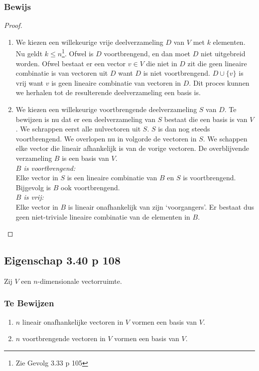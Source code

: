 \documentclass[lineaire_algebra_oplossingen.tex]{subfiles}
\begin{document}
\subsubsection*{Bewijs}
\begin{proof}
\begin{enumerate}
\item
We kiezen een willekeurige vrije deelverzameling $D$ van $V$ met $k$ elementen. Nu geldt $k\le n$\footnote{Zie Gevolg 3.33 p 105}. Ofwel is $D$ voortbrengend, en dan moet $D$ niet uitgebreid worden. Ofwel bestaat er een vector $v\in V$ die niet in $D$ zit die geen lineaire combinatie is van vectoren uit $D$ want $D$ is niet voortbrengend. $D \cup \{v\}$ is vrij want $v$ is geen lineaire combinatie van vectoren in $D$. Dit proces kunnen we herhalen tot de resulterende deelverzameling een basis is.
\item
We kiezen een willekeurige voortbrengende deelverzameling $S$ van $D$. Te bewijzen is nu dat er een deelverzameling van $S$ bestaat die een basis is van $V$. We schrappen eerst alle nulvectoren uit $S$. $S$ is dan nog steeds voortbrengend. We overlopen nu in volgorde de vectoren in $S$. We schappen elke vector die lineair afhankelijk is van de vorige vectoren. De overblijvende verzameling $B$ is een basis van $V$.\\
\emph{$B$ is voortbrengend:}\\
Elke vector in $S$ is een lineaire combinatie van $B$ en $S$ is voortbrengend. Bijgevolg is $B$ ook voortbrengend.\\
\emph{$B$ is vrij:}\\
Elke vector in $B$ is lineair onafhankelijk van zijn `voorgangers'. Er bestaat dus geen niet-triviale lineaire combinatie van de elementen in $B$.
\end{enumerate}
\end{proof}


\subsection{Eigenschap 3.40 p 108}
\label{3.40}
Zij $V$ een $n$-dimensionale vectorruimte.

\subsubsection*{Te Bewijzen}
\begin{enumerate}
\item $n$ lineair onafhankelijke vectoren in $V$ vormen een basis van $V$.
\item $n$ voortbrengende vectoren in $V$ vormen een basis van $V$.
\end{enumerate}
\end{document}
